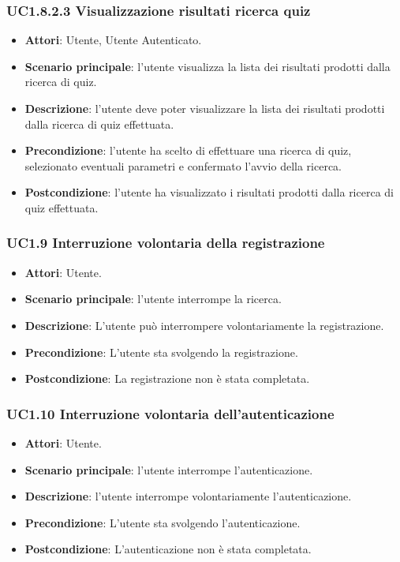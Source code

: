 \subsubsection{UC1.8.2.3 Visualizzazione risultati ricerca quiz}
\begin{itemize}
\item \textbf{Attori}: Utente, Utente Autenticato.
\item \textbf{Scenario principale}: l'utente visualizza la lista dei risultati prodotti dalla ricerca di quiz.
\item \textbf{Descrizione}: l'utente deve poter visualizzare la lista dei risultati prodotti dalla ricerca di quiz effettuata.
\item \textbf{Precondizione}: l'utente ha scelto di effettuare una ricerca di quiz, selezionato eventuali parametri e confermato l'avvio della ricerca.
\item \textbf{Postcondizione}: l'utente ha visualizzato i risultati prodotti dalla ricerca di quiz effettuata.
\end{itemize}
\subsubsection{UC1.9 Interruzione volontaria della registrazione}
\begin{itemize}
\item \textbf{Attori}: Utente.
\item \textbf{Scenario principale}: l'utente interrompe la ricerca.
\item \textbf{Descrizione}: L'utente può interrompere volontariamente la registrazione.
\item \textbf{Precondizione}: L'utente sta svolgendo la registrazione.
\item \textbf{Postcondizione}: La registrazione non è stata completata.
\end{itemize}
\subsubsection{UC1.10 Interruzione volontaria dell'autenticazione}
\begin{itemize}
\item \textbf{Attori}: Utente.
\item \textbf{Scenario principale}: l'utente interrompe l'autenticazione.
\item \textbf{Descrizione}: l'utente interrompe volontariamente l'autenticazione.
\item \textbf{Precondizione}: L'utente sta svolgendo l'autenticazione.
\item \textbf{Postcondizione}: L'autenticazione non è stata completata.
\end{itemize}
